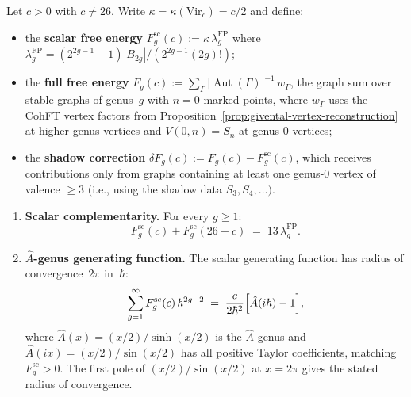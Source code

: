 \begin{theorem}%
\label{thm:gravitational-complementarity-genus-expansion}%
\ClaimStatusProvedHere%
%
Let $c > 0$ with $c \neq 26$.
Write $\kappa = \kappa(\mathrm{Vir}_c) = c/2$ and define:
\begin{itemize}
\item the \textbf{scalar free energy}
$F_g^{\mathrm{sc}}(c) := \kappa\,\lambda_g^{\mathrm{FP}}$
where
$\lambda_g^{\mathrm{FP}}
= (2^{2g-1}-1)|B_{2g}|/(2^{2g-1}(2g)!)$;
\item the \textbf{full free energy}
$F_g(c) := \sum_{\Gamma}
|\operatorname{Aut}(\Gamma)|^{-1}\,w_\Gamma$,
the graph sum over stable graphs of genus~$g$
with $n = 0$ marked points, where $w_\Gamma$
uses the CohFT vertex factors from
Proposition~\ref{prop:givental-vertex-reconstruction}
at higher-genus vertices and $V(0,n) = S_n$
at genus-$0$ vertices;
\item the \textbf{shadow correction}
$\delta F_g(c) := F_g(c) - F_g^{\mathrm{sc}}(c)$,
which receives contributions only from graphs containing
at least one genus-$0$ vertex of valence $\geq 3$
$($i.e., using the shadow data $S_3, S_4, \ldots)$.
\end{itemize}

\begin{enumerate}[label=\textup{(\roman*)}]
\item \textbf{Scalar complementarity.}
For every $g \geq 1$:
\begin{equation}\label{eq:scalar-complementarity-genus}
F_g^{\mathrm{sc}}(c) + F_g^{\mathrm{sc}}(26-c)
\;=\;
13\,\lambda_g^{\mathrm{FP}}.
\end{equation}

\item \textbf{$\hat{A}$-genus generating function.}
The scalar generating function has radius of
convergence~$2\pi$ in~$\hbar$:
\begin{equation}\label{eq:ahat-genus-gf}
\sum_{g=1}^{\infty}
F_g^{\mathrm{sc}}(c)\,\hbar^{2g-2}
\;=\;
\frac{c}{2\hbar^2}
\Bigl[\hat{A}(i\hbar) - 1\Bigr],
\end{equation}
where
$\hat{A}(x) = (x/2)/\sinh(x/2)$
is the $\hat{A}$-genus and
$\hat{A}(ix) = (x/2)/\sin(x/2)$
has all positive Taylor coefficients, matching
$F_g^{\mathrm{sc}} > 0$. The first pole of
$(x/2)/\sin(x/2)$ at $x = 2\pi$ gives the stated
radius of convergence.


\end{enumerate}
\end{theorem}
